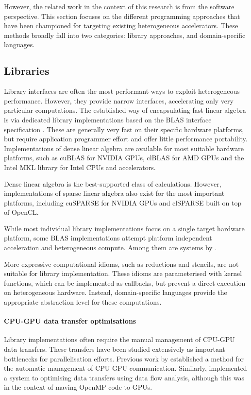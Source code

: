     However, the related work in the context of this research is from
    the software perspective.
    This section focuses on the different programming approaches that
    have been championed for targeting existing heterogeneous accelerators.
    These methods broadly fall into two categories: library approaches, and
    domain-specific languages.

\subsection{Libraries}

    Library interfaces are often the most performant ways to exploit
    heterogeneous performance.
    However, they provide narrow interfaces, accelerating only very particular
    computations.
    The established way of encapsulating fast linear algebra is via dedicated
    library implementations based on the BLAS interface specification
    \cite{2002:USB:567806.567807}.
    These are generally very fast on their specific hardware platforms, but
    require application programmer effort and offer little performance portability.
    Implementations of dense linear algebra are available for most suitable
    hardware platforms, such as cuBLAS \cite{cublas} for NVIDIA GPUs, clBLAS
    \cite{clblas} for AMD GPUs and the Intel MKL library \cite{mkl} for Intel
    CPUs and accelerators.

    Dense linear algebra is the best-supported class of calculations.
    However, implementations of sparse linear algebra also exist for
    the most important platforms, including cuSPARSE \cite{cusparse} for NVIDIA
    GPUs and clSPARSE \cite{clsparse} built on top of OpenCL.

    While most individual library implementations focus on a single target
    hardware platform, some BLAS implementations attempt platform independent
    acceleration and heterogeneous compute.
    Among them are systems by \citet{Wang:2016:BHP:2925426.2926256,
    10.1007/978-3-319-64203-1_33, Diego2017Multi}.

    More expressive computational idioms, such as reductions and stencils, are
    not suitable for library implementation.
    These idioms are parameterised with kernel functions, which can be
    implemented as callbacks, but prevent a direct execution on heterogeneous
    hardware.
    Instead, domain-specific languages provide the appropriate abstraction
    level for these computations.

    \paragraph*{CPU-GPU data transfer optimisations}
    Library implementations often require the manual management of CPU-GPU
    data transfers.
    These transfers have been studied extensively as important bottlenecks for
    parallelisation efforts.
    Previous work by \citet{Jablin:2011:ACC:1993316.1993516} established a
    method for the automatic management of CPU-GPU communication.
    Similarly, \citet{Lee:2009:OGC:1594835.1504194} implemented a system to
    optimising data transfers using data flow analysis, although this was in
    the context of maving OpenMP code to GPUs.

